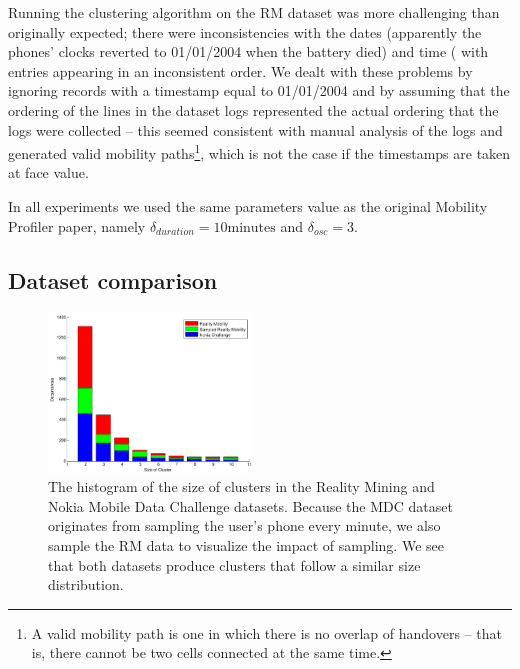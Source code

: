 \documentclass[letterpaper, 12pt, conference]{ieeeconf}
\begin{document}
Running the clustering algorithm on the RM dataset was more challenging than 
originally expected; there were inconsistencies with the dates (apparently 
the phones' clocks reverted to 01/01/2004 when the battery died) and time (
with entries appearing in an inconsistent order. We dealt with these problems 
by ignoring records with a timestamp equal to 01/01/2004 and by assuming that 
the ordering of the lines in the dataset logs represented the actual ordering 
that the logs were collected -- this seemed consistent with manual analysis 
of the logs and generated valid mobility paths\footnote{A valid mobility path 
is one in which there is no overlap of handovers -- that is, there cannot be 
two cells connected at the same time.}, which is not the case if the 
timestamps are taken at face value.

In all experiments we used the same parameters value as the original Mobility 
Profiler paper, namely $\delta_{duration} = 10 \text{minutes}$ and $\delta_{
osc} = 3$.

\subsection{Dataset comparison}

\begin{figure}
\centering
\includegraphics[width=0.48\textwidth]{figs/cluster_size}
\caption{The histogram of the size of clusters in the Reality Mining and 
Nokia Mobile Data Challenge datasets. Because the MDC dataset originates from 
sampling the user's phone every minute, we also sample the RM data to 
visualize the impact of sampling. We see that both datasets produce clusters 
that follow a similar size distribution.}
\label{fig:cluster_size}
\end{figure}
\end{document}

